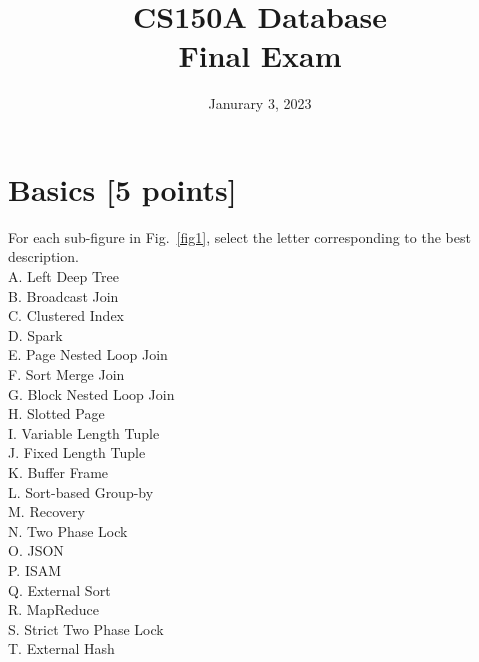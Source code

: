 \documentclass[10pt]{article}
\begin{document}
\title{CS150A Database \\%
    Final Exam}
\date{Janurary 3, 2023}
\maketitle




\section{Basics \textbf{[5 points]}}
For each sub-figure in Fig.~\ref{fig1}, select the letter corresponding to the best description. \\
A. Left Deep Tree \\
B. Broadcast Join \\
C. Clustered Index \\
D. Spark \\
E. Page Nested Loop Join \\
F. Sort Merge Join \\
G. Block Nested Loop Join \\
H. Slotted Page \\
I. Variable Length Tuple \\
J. Fixed Length Tuple \\
K. Buffer Frame \\
L. Sort-based Group-by \\
M. Recovery \\
N. Two Phase Lock \\
O. JSON \\
P. ISAM \\
Q. External Sort \\
R. MapReduce \\
S. Strict Two Phase Lock \\
T. External Hash \\
\end{document}
